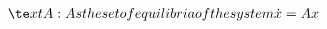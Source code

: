 \documentclass[preview]{standalone}
\begin{document}
\begin{align*}
\te x t{A: As the set of equilibria of the system } \dot x  = A{ x }
\end{align*}
\end{document}
